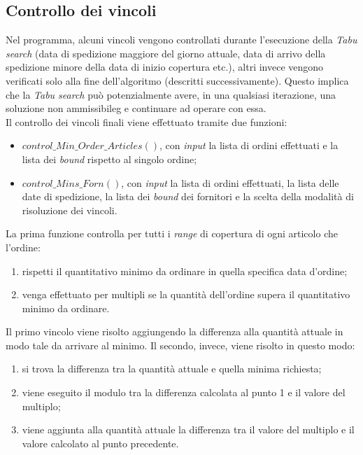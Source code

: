 \subsection{Controllo dei vincoli}
\label{sec:controllo-vincoli}
\noindent Nel programma, alcuni vincoli vengono controllati durante l'esecuzione
della \textit{Tabu search} (data di spedizione maggiore del giorno attuale,
data di arrivo della spedizione minore della data di inizio copertura etc.),
altri invece vengono verificati solo alla fine dell'algoritmo (descritti successivamente).
Questo implica che la \textit{Tabu search} può potenzialmente avere, in
una qualsiasi iterazione, una soluzione non \gls{ammissibileg} e
continuare ad operare con essa.\\
Il controllo dei vincoli finali viene effettuato tramite due funzioni:
\begin{itemize}
    \item $control\_Min\_Order\_Articles()$, con \textit{input} la
    lista di ordini effettuati e la lista dei \textit{bound} rispetto
    al singolo ordine;
    \item $control\_Mins\_Forn()$, con \textit{input} la lista di
    ordini effettuati, la lista delle date di spedizione,
    la lista dei \textit{bound} dei fornitori e la scelta della
    modalità di risoluzione dei vincoli.
\end{itemize}
\noindent La prima funzione controlla per tutti i \textit{range} di
copertura di ogni articolo che l'ordine:
\begin{enumerate}
    \item rispetti il quantitativo minimo
    da ordinare in quella specifica data d'ordine;
    \item venga effettuato per multipli se la quantità
    dell'ordine supera il quantitativo minimo da ordinare.
\end{enumerate}
Il primo vincolo viene risolto aggiungendo la differenza alla quantità attuale
in modo tale da arrivare al minimo.
Il secondo, invece, viene risolto in questo modo:
\begin{enumerate}
    \item si trova la differenza tra la quantità attuale
    e quella minima richiesta;
    \item viene eseguito il modulo tra la differenza calcolata al punto 1 e il valore del multiplo;
    \item viene aggiunta alla quantità attuale la differenza tra il valore del multiplo e il valore calcolato al punto precedente.
\end{enumerate}
